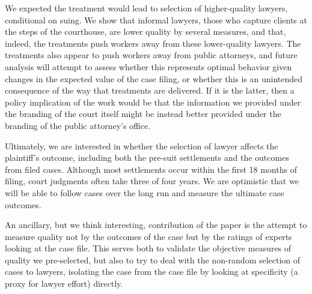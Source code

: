 \documentclass[12 pt]{article}
\begin{document}
We expected the treatment would lead to selection of higher-quality lawyers, conditional on suing. We show that informal lawyers, those who capture clients at the steps of the courthouse, are lower quality by several measures, and that, indeed, the treatments push workers away from these lower-quality lawyers. The treatments also appear to push workers away from public attorneys, and future analysis will attempt to assess whether this represents optimal behavior given changes in the expected value of the case filing, or whether this is an unintended consequence of the way that treatments are delivered. If it is the latter, then a policy implication of the work would be that the information we provided under the branding of the court itself might be instead better provided under the branding of the public attorney’s office. 

Ultimately, we are interested in whether the selection of lawyer affects the plaintiff’s outcome, including both the pre-suit settlements and the outcomes from filed cases. Although most settlements occur within the first 18 months of filing, court judgments often take three of four years. We are optimistic that we will be able to follow cases over the long run and measure the ultimate case outcomes.

An ancillary, but we think interesting, contribution of the paper is the attempt to measure quality not by the outcomes of the case but by the ratings of experts looking at the case file. This serves both to validate the objective measures of quality we pre-selected, but also to try to deal with the non-random selection of cases to lawyers, isolating the case from the case file by looking at specificity (a proxy for lawyer effort) directly.





\nocite{*}





\clearpage

\onehalfspacing









\clearpage








\clearpage
\end{document}
